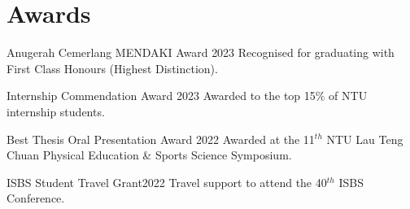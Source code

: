 \documentclass[../main.tex]{subfiles}
\begin{document}
\section{Awards}
  \vspace{2pt}
  \resumeSubHeadingListStart
    \layoutAwards
    {{Anugerah Cemerlang MENDAKI Award }\href{https://drive.google.com/file/d/1e0AXmiUYPABp2iXR39Un3uU56ksY5cPB/view?usp=sharing}{\faFilePdfO}}{2023}
    {Recognised for graduating with First Class Honours (Highest Distinction).}

    \layoutAwards
    {{Internship Commendation Award }\href{https://drive.google.com/file/d/1-Zf9n5C39MHMhlUNPOGi2Gz_DRpPg0iC/view?usp=sharing}{\faFilePdfO}}{2023}
    {Awarded to the top 15\% of NTU internship students.}

    \layoutAwards
    {{Best Thesis Oral Presentation Award }\href{https://drive.google.com/file/d/1mcvcseOSgvzBLQg3tZVkGyIOOxVw6gKw/view?usp=sharing}{\faFilePdfO}}{2022}
    {Awarded at the 11$^{th}$ NTU Lau Teng Chuan Physical Education \& Sports Science Symposium.}

    \layoutAwards
    {ISBS Student Travel Grant}{2022}
    {Travel support to attend the 40$^{th}$ ISBS Conference.}

  \resumeSubHeadingListEnd
\end{document}
